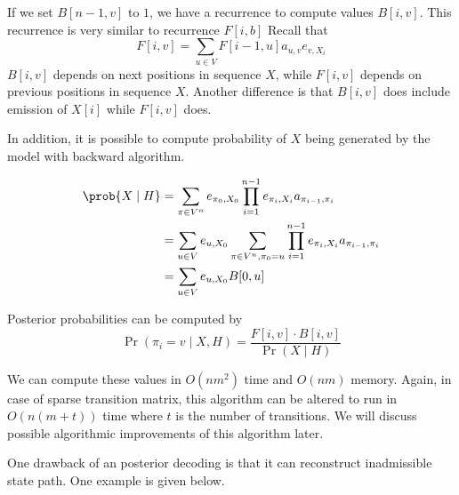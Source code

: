 If we set $B[n-1,v]$ to $1$, we have a recurrence to compute values
$B[i,v]$. This recurrence is very similar to recurrence $F[i,b]$ Recall that
\[F[i,v] = \sum_{u\in V}F[i-1,u] a_{u,v} e_{v,X_i}\]
$B[i,v]$ depends on next positions in sequence $X$,
while $F[i,v]$ depends on previous positions in sequence $X$. Another
difference is that $B[i,v]$ does include emission of $X[i]$ while $F[i,v]$ does.

In addition, it is possible to compute probability
of $X$ being generated by the model with backward algorithm.

\begin{align}
\prob{X\mid H} &= 
	\sum_{\pi\in V^n}
		e_{\pi_0,X_0}\prod_{i=1}^{n-1}e_{\pi_i,X_i}a_{\pi_{i-1},\pi_i}\\
	&=
	\sum_{u\in V}e_{u,X_0}
	\sum_{\pi\in V^n,\pi_0=u}
		\prod_{i=1}^{n-1}e_{\pi_i,X_i}a_{\pi_{i-1},\pi_i}\\
	&=
	\sum_{u\in V}e_{u,X_0}B[0,u]
\end{align}

Posterior probabilities can be computed by
\[\Pr\left(\pi_i=v\mid X,H\right) = \frac{F[i,v]\cdot B[i,v]}{\Pr\left( X\mid H
 \right)}\]


We can compute these values in $O(nm^2)$ time and $O(nm)$ memory. Again, in case
of sparse transition matrix, this algorithm can be altered to run in $O(n(m+t))$
time where $t$ is the number of transitions. We will
discuss possible algorithmic improvements of this algorithm later.


One drawback of an  posterior decoding is that it can reconstruct inadmissible
state path. One example is given below.

